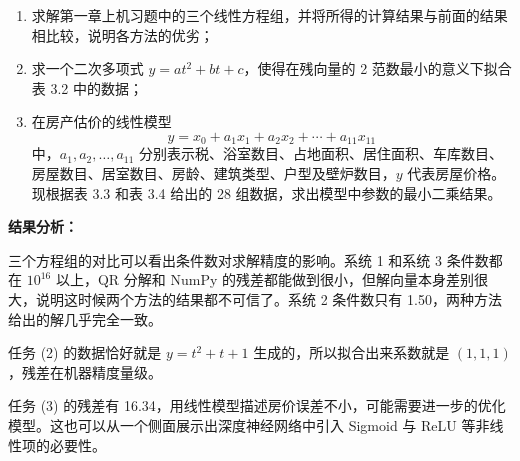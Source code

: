 \documentclass{article}
\begin{document}
\begin{enumerate}
  \item[(1)] 求解第一章上机习题中的三个线性方程组，并将所得的计算结果与前面的结果相比较，说明各方法的优劣；
  \item[(2)] 求一个二次多项式 $y = at^2 + bt + c$，使得在残向量的 2 范数最小的意义下拟合表 3.2 中的数据；
  \item[(3)] 在房产估价的线性模型
    \[
      y = x_0 + a_1 x_1 + a_2 x_2 + \cdots + a_{11} x_{11}
    \]
    中，$a_1, a_2, \ldots, a_{11}$
    分别表示税、浴室数目、占地面积、居住面积、车库数目、房屋数目、居室数目、房龄、建筑类型、户型及壁炉数目，$y$
    代表房屋价格。现根据表 3.3 和表 3.4 给出的 28 组数据，求出模型中参数的最小二乘结果。
\end{enumerate}

\begin{solution}

  \mbox{}

  

  

  

  \textbf{结果分析：}

  三个方程组的对比可以看出条件数对求解精度的影响。系统 1 和系统 3 条件数都在 $10^{16}$ 以上，QR 分解和 NumPy
  的残差都能做到很小，但解向量本身差别很大，说明这时候两个方法的结果都不可信了。系统 2 条件数只有 1.50，两种方法给出的解几乎完全一致。

  任务 (2) 的数据恰好就是 $y = t^2 + t + 1$ 生成的，所以拟合出来系数就是 $(1, 1, 1)$，残差在机器精度量级。

  任务 (3) 的残差有 16.34，用线性模型描述房价误差不小，可能需要进一步的优化模型。这也可以从一个侧面展示出深度神经网络中引入 Sigmoid 与 ReLU 等非线性项的必要性。

\end{solution}
\end{document}

